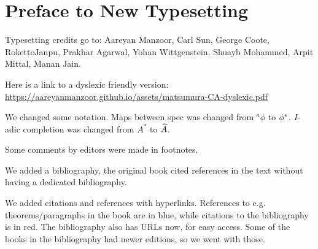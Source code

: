 \documentclass[../main]{subfiles}
\begin{document}
\chapter*{Preface to New Typesetting}

Typesetting credits go to: Aareyan Manzoor, Carl Sun, George Coote, RokettoJanpu, Prakhar Agarwal, Yohan Wittgenstein, Shuayb Mohammed, Arpit Mittal, Manan Jain. %

Here is a link to a dyslexic friendly version: \url{https://aareyanmanzoor.github.io/assets/matsumura-CA-dyslexic.pdf}

We changed some notation. Maps between spec was changed from $^a\phi$ to $\phi^\ast$. $I$-adic completion was changed from $A^\ast$ to $\widehat{A}$.

Some comments by editors were made in footnotes.

We added a bibliography, the original book cited references in the text without having a dedicated bibliography.

We added citations and references with hyperlinks. References to e.g. theorems/paragraphs in the book are in blue, while citations to the bibliography is in red. The bibliography also has URLs now, for easy access. Some of the books in the bibliography  had newer editions, so we went with those.
\end{document}
